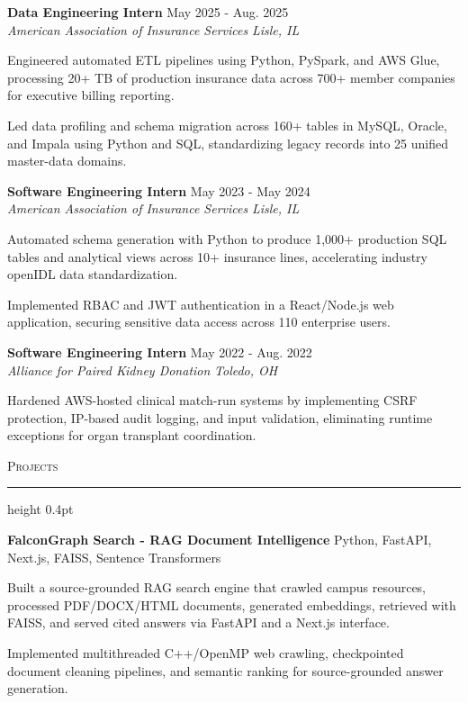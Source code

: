 \documentclass[letterpaper,11pt]{article}
\newcommand{\resumesection}[1]{%
  \par\vspace{2pt}%
  {\large\scshape #1}\par\vspace{2pt}%
  \hrule height 0.4pt\vspace{2pt}%
}
\newcommand{\resumeSubheading}[4]{
  \textbf{#1} \hfill #2\\
  \textit{#3} \hfill \textit{#4}
}
\newcommand{\projectHeading}[2]{
  \textbf{#1} \hfill #2
}
\begin{document}
\resumeSubheading
{Data Engineering Intern}{May 2025 - Aug. 2025}
{American Association of Insurance Services}{Lisle, IL}
\begin{tightitemize}
  \item Engineered automated ETL pipelines using Python, PySpark, and AWS Glue, processing 20+ TB of production insurance data across 700+ member companies for executive billing reporting.
  \item Led data profiling and schema migration across 160+ tables in MySQL, Oracle, and Impala using Python and SQL, standardizing legacy records into 25 unified master-data domains.
\end{tightitemize}

\resumeSubheading
{Software Engineering Intern}{May 2023 - May 2024}
{American Association of Insurance Services}{Lisle, IL}
\begin{tightitemize}
  \item Automated schema generation with Python to produce 1,000+ production SQL tables and analytical views across 10+ insurance lines, accelerating industry openIDL data standardization.
  \item Implemented RBAC and JWT authentication in a React/Node.js web application, securing sensitive data access across 110 enterprise users.
\end{tightitemize}

\resumeSubheading
{Software Engineering Intern}{May 2022 - Aug. 2022}
{Alliance for Paired Kidney Donation}{Toledo, OH}
\begin{tightitemize}
  \item Hardened AWS-hosted clinical match-run systems by implementing CSRF protection, IP-based audit logging, and input validation, eliminating runtime exceptions for organ transplant coordination.
\end{tightitemize}

\resumesection{Projects}
\projectHeading{FalconGraph Search - RAG Document Intelligence}{Python, FastAPI, Next.js, FAISS, Sentence Transformers}
\begin{tightitemize}
  \item Built a source-grounded RAG search engine that crawled campus resources, processed PDF/DOCX/HTML documents, generated embeddings, retrieved with FAISS, and served cited answers via FastAPI and a Next.js interface.
  \item Implemented multithreaded C++/OpenMP web crawling, checkpointed document cleaning pipelines, and semantic ranking for source-grounded answer generation.
\end{tightitemize}
\end{document}
